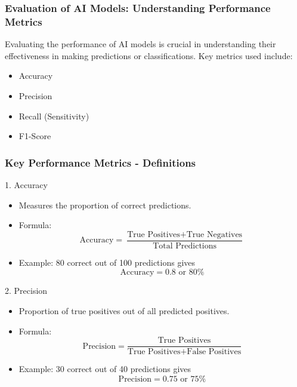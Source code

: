 \documentclass{beamer}
\begin{document}
\begin{frame}[fragile]
    \frametitle{Evaluation of AI Models: Understanding Performance Metrics}

    Evaluating the performance of AI models is crucial in understanding their effectiveness in making predictions or classifications. Key metrics used include:
    
    \begin{itemize}
        \item Accuracy
        \item Precision
        \item Recall (Sensitivity)
        \item F1-Score
    \end{itemize}
\end{frame}

\begin{frame}[fragile]
    \frametitle{Key Performance Metrics - Definitions}

    \begin{block}{1. Accuracy}
        \begin{itemize}
            \item Measures the proportion of correct predictions.
            \item Formula:
              \[
              \text{Accuracy} = \frac{\text{True Positives} + \text{True Negatives}}{\text{Total Predictions}}
              \]
            \item Example: 80 correct out of 100 predictions gives 
              \[
              \text{Accuracy} = 0.8 \text{ or } 80\%
              \]
        \end{itemize}
    \end{block}

    \begin{block}{2. Precision}
        \begin{itemize}
            \item Proportion of true positives out of all predicted positives.
            \item Formula:
              \[
              \text{Precision} = \frac{\text{True Positives}}{\text{True Positives} + \text{False Positives}}
              \]
            \item Example: 30 correct out of 40 predictions gives 
              \[
              \text{Precision} = 0.75 \text{ or } 75\%
              \]
        \end{itemize}
    \end{block}
\end{frame}
\end{document}
